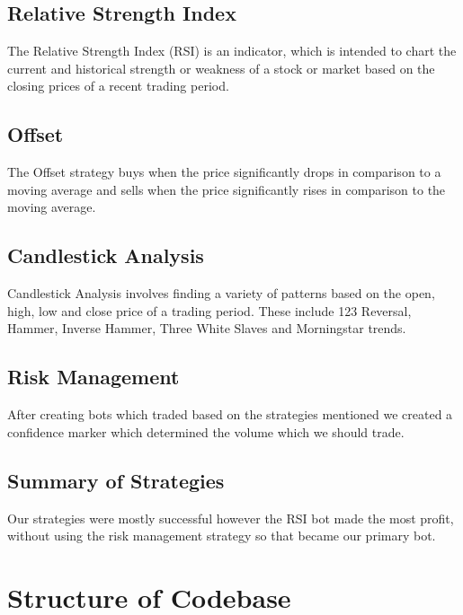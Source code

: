 \documentclass[a4paper12pt, twocolumn]{article}
\begin{document}
\subsection{Relative Strength Index}
The Relative Strength Index (RSI) is an indicator, which is intended to chart the current and historical strength or weakness of a stock or market based on the closing prices of a recent trading period.
\subsection{Offset}
The Offset strategy buys when the price  significantly drops in comparison to a moving average and sells when the price significantly rises in comparison to the moving average.
\subsection{Candlestick Analysis}
Candlestick Analysis involves finding a variety of patterns based on the open, high, low and close price of a trading period. These include 123 Reversal, Hammer, Inverse Hammer, Three White Slaves and Morningstar trends.
\subsection{Risk Management}
After creating bots which traded based on the strategies mentioned we created a confidence marker which determined the volume which we should trade.
\subsection{Summary of Strategies}
Our strategies were mostly successful however the RSI bot made the most profit, without using the risk management strategy so that became our primary bot.

\section{Structure of Codebase}
\end{document}
